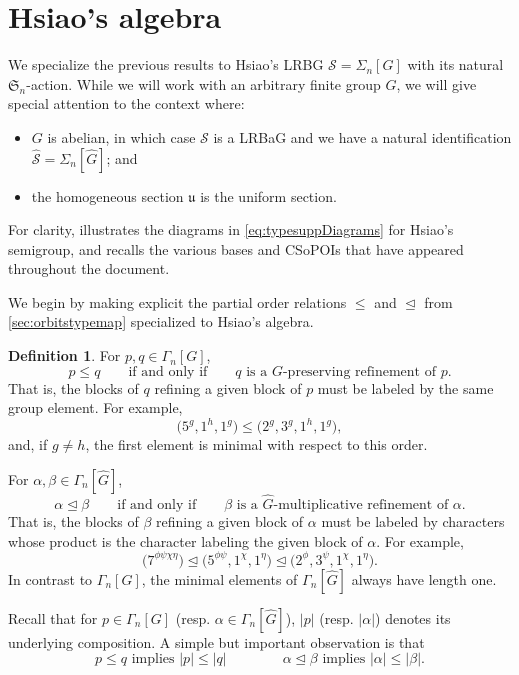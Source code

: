 \documentclass[11pt, oneside, reqno]{amsart}
\theoremstyle{definition}
\newtheorem{definition}[theorem]{Definition}
\numberwithin{equation}{section}
\def \SS{{\mathcal{S}}}
\def \sym{\mathfrak{S}}
\def \uu{{\mathfrak{u}}}
\def \wh{\widehat}
\def \gsetcomposition{{\Sigma_n[G]}}
\def \hsiao {{\gsetcomposition}}
\DeclareMathOperator{\chleq}{\unlhd}
\def\qqiff{\qquad\text{if and only if}\qquad}
\newcommand{\abs}[1]{|{#1}|} 				%
\begin{document}
\section{Hsiao's algebra}\label{sec:hsiaosalgebra}


We specialize the previous results to Hsiao's LRBG $\SS = \hsiao$ with its natural $\sym_n$-action.
While we will work with an arbitrary finite group $G$, we will give special attention to the context where:
\begin{itemize}[wide]
    \item $G$ is abelian, in which case $\SS$ is a LRBaG and
        we have a natural identification $\wh{\SS} = \Sigma_n[\wh{G}]$; and
    \item the homogeneous section $\uu$ is the uniform section.
\end{itemize}
For clarity,  illustrates the diagrams in \cref{eq:typesuppDiagrams} for Hsiao's semigroup, and recalls the various bases and CSoPOIs that have appeared throughout the document.

We begin by making explicit the partial order relations $\leq$ and $\chleq$ from \cref{sec:orbitstypemap} specialized to Hsiao's algebra.

\begin{definition}\label{def:orderforMR}
    For $p, q \in \Gamma_n[G]$, 
    \[
        p \leq q
        \qqiff
        \text{$q$ is a $G$-preserving refinement of $p$.}
    \]
    That is, the blocks of $q$ refining a given block of $p$ must be labeled by the same group element.
    For example,
    \[
        \big( 5^g , 1^h , 1^g \big) \leq \big( 2^g , 3^g , 1^h , 1^g \big),
    \]
    and, if $g \neq h$, the first element is minimal with respect to this order.
    
    For $\alpha, \beta \in \Gamma_n[\wh{G}]$, 
    \[
        \alpha \chleq \beta
        \qqiff
        \text{$\beta$ is a $\wh{G}$-multiplicative refinement of $\alpha$.}
    \]
    That is, the blocks of $\beta$ refining a given block of $\alpha$ must be labeled by characters whose product is the character labeling the given block of $\alpha$.
    For example,
    \[
        \big( 7^{\phi\psi\chi\eta} \big) \chleq \big( 5^{\phi\psi} , 1^\chi , 1^\eta \big) \chleq \big( 2^\phi , 3^\psi , 1^\chi , 1^\eta \big).
    \]
    In contrast to $\Gamma_n[G]$, the minimal elements of $\Gamma_n[\wh{G}]$ always have length one.

    Recall that for $p \in \Gamma_n[G]$ (resp. $\alpha \in \Gamma_n[\wh{G}]$), $\abs{p}$ (resp. $\abs{\alpha}$) denotes its underlying composition.
    A simple but important observation is that
    \[
        p \leq q \textrm{ implies } \abs{p} \leq \abs{q}
        \qquad\qquad
        \alpha \chleq \beta \textrm{ implies } \abs{\alpha} \leq \abs{\beta}.
    \]
\end{definition}
\end{document}
